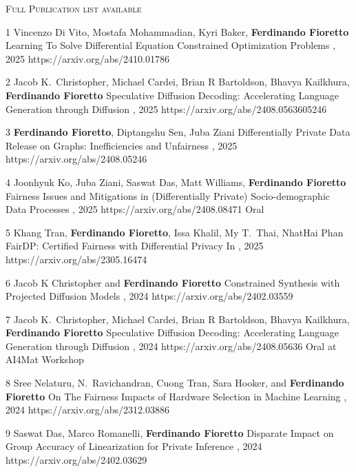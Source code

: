 \documentclass[localFont,alternative]{documentMETADATA}
\begin{document}
{\textsc{Full Publication list available  }}
\begin{pubs}

\confentryShort
	{1}
	{{Vincenzo Di Vito}, Mostafa Mohammadian, Kyri Baker, {\bf Ferdinando Fioretto}}
	{Learning To Solve Differential Equation Constrained Optimization Problems}
	{\procICLR, 2025}
	{https://arxiv.org/abs/2410.01786}

\confentryShort
	{2}
	{{Jacob K.~Christopher}, {Michael Cardei}, Brian R Bartoldson, Bhavya Kailkhura, {\bf Ferdinando Fioretto}}
	{Speculative Diffusion Decoding: Accelerating Language Generation through Diffusion}
	{\procNAACL, 2025}
	{https://arxiv.org/abs/2408.0563605246}

\confentryShort
	{3}
	{{\bf Ferdinando Fioretto}, Diptangshu Sen, Juba Ziani}
	{Differentially Private Data Release on Graphs: Inefficiencies and Unfairness}
	{\procAISTATS, 2025}
	{https://arxiv.org/abs/2408.05246}

\confentryShortAwd
	{4}
	{{Joonhyuk Ko}, Juba Ziani, {Saswat Das}, Matt Williams, {\bf Ferdinando Fioretto}}
	{Fairness Issues and Mitigations in (Differentially Private) Socio-demographic Data Processes}
	{\procAAAI, 2025}
	{https://arxiv.org/abs/2408.08471}
	{Oral}

\confentryShort
	{5}
	{Khang Tran, {\bf Ferdinando Fioretto}, Issa Khalil, My T.~Thai, NhatHai Phan}
	{FairDP: Certified Fairness with Differential Privacy}
	{In , 2025}
	{https://arxiv.org/abs/2305.16474}

\confentryShort
	{6}
	{Jacob K Christopher and {\bf Ferdinando Fioretto}}
	{Constrained Synthesis with Projected Diffusion Models}
	{\procNeurIPS, 2024}
	{https://arxiv.org/abs/2402.03559}

\confentryShortAwd
	{7}
	{Jacob K.~Christopher, Michael Cardei, Brian R Bartoldson, Bhavya Kailkhura, {\bf Ferdinando Fioretto}}
	{Speculative Diffusion Decoding: Accelerating Language Generation through Diffusion}
	{\procNeurIPS, 2024}
	{https://arxiv.org/abs/2408.05636}
	{Oral at AI4Mat Workshop}

\confentryShort
	{8}
	{Sree Nelaturu, N.~Ravichandran, Cuong Tran, Sara Hooker, and {\bf Ferdinando Fioretto}}
	{On The Fairness Impacts of Hardware Selection in Machine Learning}	
	{\procICML, 2024}
	{https://arxiv.org/abs/2312.03886}

\confentryShort
	{9}
	{Saswat Das, Marco Romanelli, {\bf Ferdinando Fioretto}}
	{Disparate Impact on Group Accuracy of Linearization for Private Inference}
	{\procICML, 2024}
	{https://arxiv.org/abs/2402.03629}
	

\end{pubs}
\end{document}
